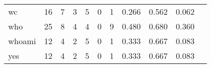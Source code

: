 \begin{longtable}{lp{1.2cm}p{1.2cm}p{1.2cm}p{1.2cm}p{1.2cm}p{1.2cm}p{1.2cm}p{1.2cm}p{1.2cm}p{1.2cm}}
wc        &                                    16 &                                                  7 &                                                  3 &                                                  5 &                                                  0 &                                                  1 &                                              0.266 &                                              0.562 &                                              0.062 \\
who       &                                    25 &                                                  8 &                                                  4 &                                                  4 &                                                  0 &                                                  9 &                                              0.480 &                                              0.680 &                                              0.360 \\
whoami    &                                    12 &                                                  4 &                                                  2 &                                                  5 &                                                  0 &                                                  1 &                                              0.333 &                                              0.667 &                                              0.083 \\
yes       &                                    12 &                                                  4 &                                                  2 &                                                  5 &                                                  0 &                                                  1 &                                              0.333 &                                              0.667 &                                              0.083 \\
\end{longtable}
